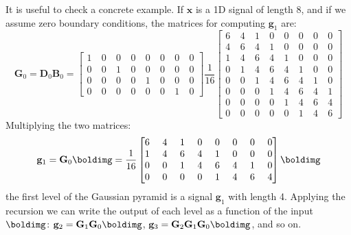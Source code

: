 It is useful to check a concrete example. If $\mathbf{x}$ is a 1D signal of length 8, and if we assume zero boundary conditions, the matrices for computing $\mathbf{g}_1$ are:
\begin{equation}
\mathbf{G}_0 = \mathbf{D}_0 \mathbf{B}_0 =
\begin{bmatrix}
  1 ~& 0 ~& 0 ~& 0 ~& 0 ~& 0 ~& 0 ~& 0 \\
  0 ~& 0 ~& 1 ~& 0 ~& 0 ~& 0 ~& 0 ~& 0 \\
  0 ~& 0 ~& 0 ~& 0 ~& 1 ~& 0 ~& 0 ~& 0 \\
  0 ~& 0 ~& 0 ~& 0 ~& 0 ~& 0 ~& 1 ~& 0
 \end{bmatrix}
 \frac{1}{16}
 \begin{bmatrix}
  6 ~& 4 ~& 1 ~& 0 ~& 0 ~& 0 ~& 0 ~& 0 \\
  4 ~& 6 ~& 4 ~& 1 ~& 0 ~& 0 ~& 0 ~& 0 \\
  1 ~& 4 ~& 6 ~& 4 ~& 1 ~& 0 ~& 0 ~& 0 \\
  0 ~& 1 ~& 4 ~& 6 ~& 4 ~& 1 ~& 0 ~& 0 \\
  0 ~& 0 ~& 1 ~& 4 ~& 6 ~& 4 ~& 1 ~& 0 \\
  0 ~& 0 ~& 0 ~& 1 ~& 4 ~& 6 ~& 4 ~& 1 \\
  0 ~& 0 ~& 0 ~& 0 ~& 1 ~& 4 ~& 6 ~& 4 \\
  0 ~& 0 ~& 0 ~& 0 ~& 0 ~& 1 ~& 4 ~& 6 
\end{bmatrix}
\end{equation}
Multiplying the two matrices:
\begin{equation}
\mathbf{g}_{1} = \mathbf{G}_0 \boldimg = 
 \frac{1}{16}
 \begin{bmatrix}
  6 ~& 4 ~& 1 ~& 0 ~& 0 ~& 0 ~& 0 ~& 0 \\
  1 ~& 4 ~& 6 ~& 4 ~& 1 ~& 0 ~& 0 ~& 0 \\
  0 ~& 0 ~& 1 ~& 4 ~& 6 ~& 4 ~& 1 ~& 0 \\
  0 ~& 0 ~& 0 ~& 0 ~& 1 ~& 4 ~& 6 ~& 4 
 \end{bmatrix}
 \boldimg
 \end{equation}
the first level of the Gaussian pyramid is a signal $\mathbf{g}_1$ with length 4. Applying the recursion we can write the output of each level as a function of the input $\boldimg$:  $\mathbf{g}_{2} = \mathbf{G}_1 \mathbf{G}_0 \boldimg$, $\mathbf{g}_{3} = \mathbf{G}_2 \mathbf{G}_1 \mathbf{G}_0 \boldimg$, and so on. 
 


%
%
%

